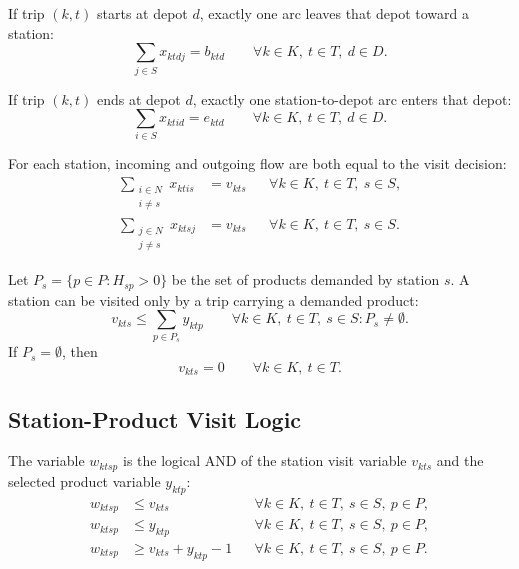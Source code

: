 \documentclass[11pt,a4paper]{article}
\begin{document}
If trip \((k,t)\) starts at depot \(d\), exactly one arc leaves that depot
toward a station:
\begin{equation}
    \sum_{j \in S} x_{ktdj} = b_{ktd}
    \qquad \forall k \in K,\ t \in T,\ d \in D.
\label{eq:start-flow}
\end{equation}

If trip \((k,t)\) ends at depot \(d\), exactly one station-to-depot arc enters
that depot:
\begin{equation}
    \sum_{i \in S} x_{ktid} = e_{ktd}
    \qquad \forall k \in K,\ t \in T,\ d \in D.
\label{eq:end-flow}
\end{equation}

For each station, incoming and outgoing flow are both equal to the visit
decision:
\begin{align}
    \sum_{\substack{i \in N\\i\neq s}} x_{ktis} &= v_{kts}
        && \forall k \in K,\ t \in T,\ s \in S, \label{eq:station-in}\\
    \sum_{\substack{j \in N\\j\neq s}} x_{ktsj} &= v_{kts}
        && \forall k \in K,\ t \in T,\ s \in S. \label{eq:station-out}
\end{align}

Let \(P_s=\{p\in P:H_{sp}>0\}\) be the set of products demanded by station
\(s\). A station can be visited only by a trip carrying a demanded product:
\begin{equation}
    v_{kts} \leq \sum_{p \in P_s} y_{ktp}
    \qquad \forall k \in K,\ t \in T,\ s \in S: P_s \neq \emptyset.
\label{eq:visit-product}
\end{equation}
If \(P_s=\emptyset\), then
\begin{equation}
    v_{kts}=0
    \qquad \forall k \in K,\ t \in T.
\label{eq:no-demand-visit}
\end{equation}

\subsection{Station-Product Visit Logic}

The variable \(w_{ktsp}\) is the logical AND of the station visit variable
\(v_{kts}\) and the selected product variable \(y_{ktp}\):
\begin{align}
    w_{ktsp} &\leq v_{kts}
        && \forall k \in K,\ t \in T,\ s \in S,\ p \in P, \label{eq:w-visit}\\
    w_{ktsp} &\leq y_{ktp}
        && \forall k \in K,\ t \in T,\ s \in S,\ p \in P, \label{eq:w-product}\\
    w_{ktsp} &\geq v_{kts} + y_{ktp} - 1
        && \forall k \in K,\ t \in T,\ s \in S,\ p \in P. \label{eq:w-and}
\end{align}
\end{document}
